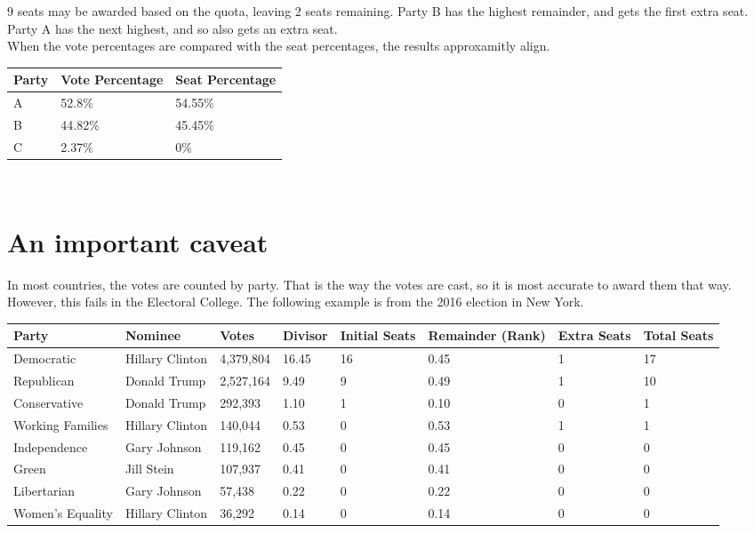 \documentclass{article}
\begin{document}
    9 seats may be awarded based on the quota, leaving 2 seats remaining. Party B has the highest remainder, and gets the first extra seat. Party A has the next highest, and so also gets an extra seat. \\

    When the vote percentages are compared with the seat percentages, the results approxamitly align.\\
    
    \begin{adjustbox}{center}
    \begin{tabular}{ |l|l|l| }
        \hline
        Party & Vote Percentage & Seat Percentage \\
        \hline
        A & 52.8\% & 54.55\% \\
        \hline
        B & 44.82\% & 45.45\% \\
        \hline
        C & 2.37\% & 0\% \\
        \hline
    \end{tabular}
    \end{adjustbox}\\

    \section{An important caveat}

    In most countries, the votes are counted by party. That is the way the votes are cast, so it is most accurate to award them that way. However, this fails in the Electoral College. The following example is from the 2016 election in New York.\\

    \begin{adjustbox}{center}
    \begin{tabular}{ |l|l|l|l|l|l|l|l| }
        \hline
        Party & Nominee & Votes & Divisor & Initial Seats & Remainder (Rank) & Extra Seats & Total Seats \\
        \hline
        Democratic & Hillary Clinton & 4,379,804 & 16.45 & 16 & 0.45 & 1 & 17 \\
        \hline
        Republican & Donald Trump & 2,527,164 & 9.49 & 9 & 0.49 & 1 & 10 \\
        \hline
        Conservative & Donald Trump & 292,393 & 1.10 & 1 & 0.10 & 0 & 1 \\
        \hline
        Working Families & Hillary Clinton & 140,044 & 0.53 & 0 & 0.53 & 1 & 1 \\
        \hline
        Independence & Gary Johnson & 119,162 & 0.45 & 0 & 0.45 & 0 & 0 \\
        \hline
        Green & Jill Stein & 107,937 & 0.41 & 0 & 0.41 & 0 & 0 \\
        \hline
        Libertarian & Gary Johnson & 57,438 & 0.22 & 0 & 0.22 & 0 & 0 \\
        \hline
        Women's Equality & Hillary Clinton & 36,292 & 0.14 & 0 & 0.14 & 0 & 0 \\
        \hline
    \end{tabular}
    \end{adjustbox} \\
\end{document}
